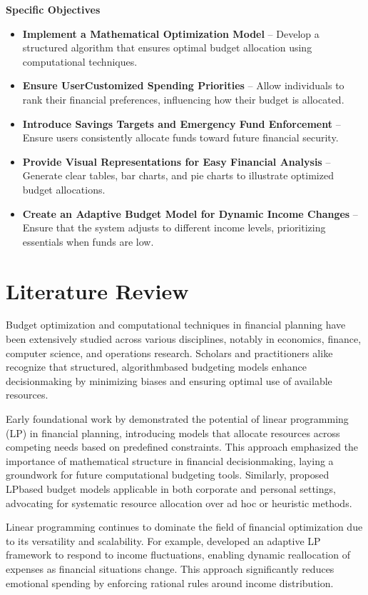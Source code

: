 \documentclass{article}
\begin{document}
\textbf{Specific Objectives}
\begin{itemize}
    \item \textbf{Implement a Mathematical Optimization Model} – Develop a structured algorithm that ensures optimal budget allocation using computational techniques.
    \item \textbf{Ensure UserCustomized Spending Priorities} – Allow individuals to rank their financial preferences, influencing how their budget is allocated.
    \item \textbf{Introduce Savings Targets and Emergency Fund Enforcement} – Ensure users consistently allocate funds toward future financial security.
    \item \textbf{Provide Visual Representations for Easy Financial Analysis} – Generate clear tables, bar charts, and pie charts to illustrate optimized budget allocations.
    \item \textbf{Create an Adaptive Budget Model for Dynamic Income Changes} – Ensure that the system adjusts to different income levels, prioritizing essentials when funds are low.
\end{itemize}
\section{Literature Review}

Budget optimization and computational techniques in financial planning have been extensively studied across various disciplines, notably in economics, finance, computer science, and operations research. Scholars and practitioners alike recognize that structured, algorithmbased budgeting models enhance decisionmaking by minimizing biases and ensuring optimal use of available resources.

Early foundational work by \cite{pogue1971linear} demonstrated the potential of linear programming (LP) in financial planning, introducing models that allocate resources across competing needs based on predefined constraints. This approach emphasized the importance of mathematical structure in financial decisionmaking, laying a groundwork for future computational budgeting tools. Similarly, \cite{ijiri1965linear} proposed LPbased budget models applicable in both corporate and personal settings, advocating for systematic resource allocation over ad hoc or heuristic methods.

Linear programming continues to dominate the field of financial optimization due to its versatility and scalability. For example, \cite{kerbl2011optimization} developed an adaptive LP framework to respond to income fluctuations, enabling dynamic reallocation of expenses as financial situations change. This approach significantly reduces emotional spending by enforcing rational rules around income distribution.
\end{document}
